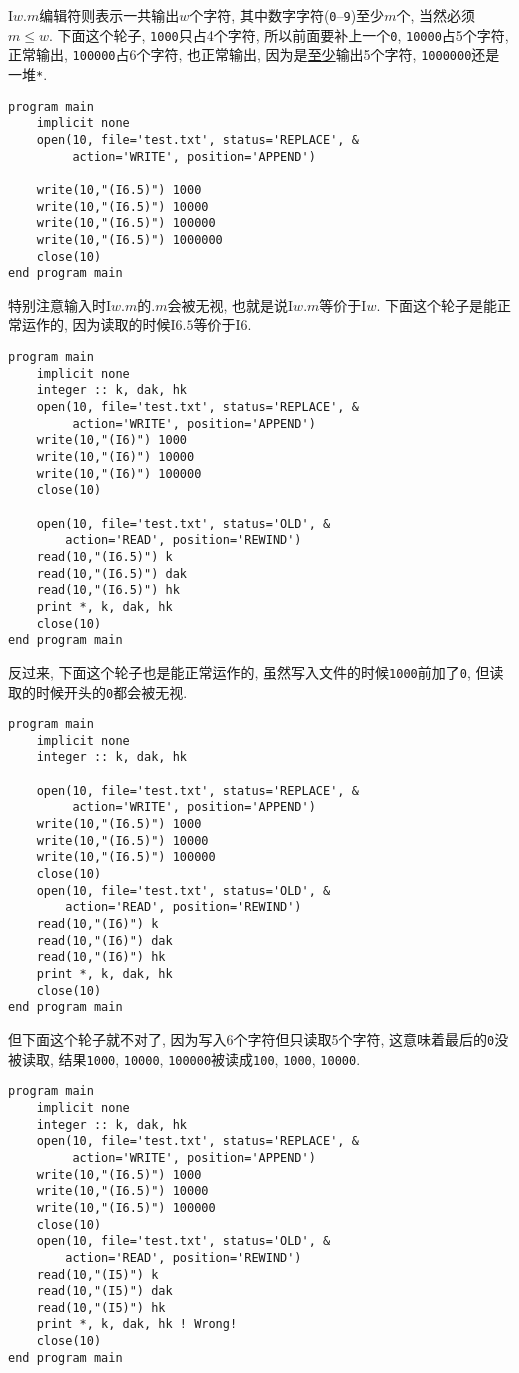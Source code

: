I$w.m$编辑符则表示一共输出$w$个字符, 其中数字字符(\texttt{0}--\texttt{9})至少$m$个, 当然必须$m\leqslant  w$. 下面这个轮子, \texttt{1000}只占4个字符, 所以前面要补上一个\texttt{0}, \texttt{10000}占5个字符, 正常输出, \texttt{100000}占6个字符, 也正常输出, 因为是\uline{至少}输出5个字符, \texttt{1000000}还是一堆\texttt{*}.
\begin{lstlisting}
program main
    implicit none
    open(10, file='test.txt', status='REPLACE', &
         action='WRITE', position='APPEND')

    write(10,"(I6.5)") 1000
    write(10,"(I6.5)") 10000
    write(10,"(I6.5)") 100000
    write(10,"(I6.5)") 1000000
    close(10)
end program main
\end{lstlisting}
特别注意输入时I$w.m$的$.m$会被无视, 也就是说I$w.m$等价于I$w$. 下面这个轮子是能正常运作的, 因为读取的时候I$6.5$等价于I$6$.
\begin{lstlisting}
program main
    implicit none
    integer :: k, dak, hk
    open(10, file='test.txt', status='REPLACE', &
         action='WRITE', position='APPEND')
    write(10,"(I6)") 1000
    write(10,"(I6)") 10000
    write(10,"(I6)") 100000
    close(10)

    open(10, file='test.txt', status='OLD', &
        action='READ', position='REWIND')
    read(10,"(I6.5)") k
    read(10,"(I6.5)") dak
    read(10,"(I6.5)") hk
    print *, k, dak, hk
    close(10)
end program main
\end{lstlisting}
反过来, 下面这个轮子也是能正常运作的, 虽然写入文件的时候\texttt{1000}前加了\texttt{0}, 但读取的时候开头的\texttt{0}都会被无视.
\begin{lstlisting}
program main
    implicit none
    integer :: k, dak, hk

    open(10, file='test.txt', status='REPLACE', &
         action='WRITE', position='APPEND')
    write(10,"(I6.5)") 1000
    write(10,"(I6.5)") 10000
    write(10,"(I6.5)") 100000
    close(10)
    open(10, file='test.txt', status='OLD', &
        action='READ', position='REWIND')
    read(10,"(I6)") k
    read(10,"(I6)") dak
    read(10,"(I6)") hk
    print *, k, dak, hk
    close(10)
end program main
\end{lstlisting}
但下面这个轮子就不对了, 因为写入6个字符但只读取5个字符, 这意味着最后的\texttt{0}没被读取, 结果\texttt{1000}, \texttt{10000}, \texttt{100000}被读成\texttt{100}, \texttt{1000}, \texttt{10000}.
\begin{lstlisting}
program main
    implicit none
    integer :: k, dak, hk
    open(10, file='test.txt', status='REPLACE', &
         action='WRITE', position='APPEND')
    write(10,"(I6.5)") 1000
    write(10,"(I6.5)") 10000
    write(10,"(I6.5)") 100000
    close(10)
    open(10, file='test.txt', status='OLD', &
        action='READ', position='REWIND')
    read(10,"(I5)") k
    read(10,"(I5)") dak
    read(10,"(I5)") hk
    print *, k, dak, hk ! Wrong!
    close(10)
end program main
\end{lstlisting}

